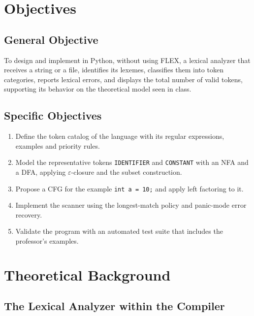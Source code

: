 \documentclass[11pt,letterpaper]{article}
\newcommand{\tok}[1]{\texttt{#1}}
\begin{document}
\section{Objectives}

\subsection{General Objective}

To design and implement in Python, without using FLEX, a lexical analyzer that
receives a string or a file, identifies its lexemes, classifies them into
token categories, reports lexical errors, and displays the total number of
valid tokens, supporting its behavior on the theoretical model seen in class.

\subsection{Specific Objectives}

\begin{enumerate}[nosep]
  \item Define the token catalog of the language with its regular
        expressions, examples and priority rules.
  \item Model the representative tokens \tok{IDENTIFIER} and \tok{CONSTANT}
        with an NFA and a DFA, applying $\varepsilon$-closure and the subset
        construction.
  \item Propose a CFG for the example \tok{int a = 10;} and apply left
        factoring to it.
  \item Implement the scanner using the longest-match policy and panic-mode
        error recovery.
  \item Validate the program with an automated test suite that includes the
        professor's examples.
\end{enumerate}

\section{Theoretical Background}

\subsection{The Lexical Analyzer within the Compiler}
\end{document}
